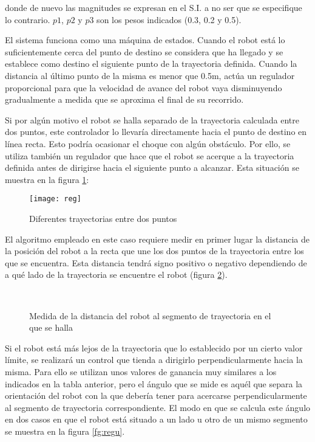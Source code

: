 donde de nuevo las magnitudes se expresan en el S.I. a no ser que se especifique lo contrario. $p1$, $p2$ y $p3$ son los pesos indicados (0.3, 0.2 y 0.5).

El sistema funciona como una máquina de estados. Cuando el robot está lo suficientemente cerca del punto de destino se considera que ha llegado y se establece como destino el siguiente punto de la trayectoria definida. Cuando la distancia al último punto de la misma es menor que 0.5m, actúa un regulador proporcional para que la velocidad de avance del robot vaya disminuyendo gradualmente a medida que se aproxima el final de su recorrido.

Si por algún motivo el robot se halla separado de la trayectoria calculada entre dos puntos, este controlador lo llevaría directamente hacia el punto de destino en línea recta. Esto podría ocasionar el choque con algún obstáculo. Por ello, se utiliza también un regulador que hace que el robot se acerque a la trayectoria definida antes de dirigirse hacia el siguiente punto a alcanzar. Esta situación se muestra en la figura \ref{fg:reg}:

\begin{figure}[h]
  \centering\texttt{[image: reg]}\\
  \caption{Diferentes trayectorias entre dos puntos}\label{fg:reg}
\end{figure}

El algoritmo empleado en este caso requiere medir en primer lugar la distancia de la posición del robot a la recta que une los dos puntos de la trayectoria entre los que se encuentra. Esta distancia tendrá signo positivo o negativo dependiendo de a qué lado de la trayectoria se encuentre el robot (figura \ref{fg:dist2tray}).

\begin{figure}[h]
    \\
  \caption{ Medida de la distancia del robot al segmento de trayectoria en el que se halla}\label{fg:dist2tray}
\end{figure}

\clearpage
Si el robot está más lejos de la trayectoria que lo establecido por un cierto valor límite, se realizará un control que tienda a dirigirlo perpendicularmente hacia la misma. Para ello se utilizan unos valores de ganancia muy similares a los indicados en la tabla anterior, pero el ángulo que se mide es aquél que separa la orientación del robot con la que debería tener para acercarse perpendicularmente al segmento de trayectoria correspondiente. El modo en que se calcula este ángulo en dos casos en que el robot está situado a un lado u otro de un mismo segmento se muestra en la figura \ref{fg:regu}.

